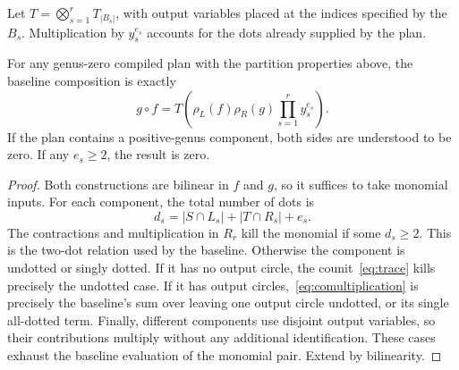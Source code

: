 Let $T=\bigotimes_{s=1}^{r}T_{|B_s|}$, with output variables placed at the
indices specified by the $B_s$. Multiplication by $y_s^{e_s}$ accounts for
the dots already supplied by the plan.

\begin{theorem}
\label{thm:factorization}
For any genus-zero compiled plan with the partition properties above,
the baseline composition is exactly
\begin{equation}
 g\circ f
 =T\left(\rho_L(f)\rho_R(g)\prod_{s=1}^{r}y_s^{e_s}\right).
 \label{eq:factorization}
\end{equation}
If the plan contains a positive-genus component, both sides are understood
to be zero. If any $e_s\geq2$, the result is zero.
\end{theorem}
\begin{proof}
Both constructions are bilinear in $f$ and $g$, so it suffices to take
monomial inputs. For each component, the total number of dots is
\[
 d_s=|S\cap L_s|+|T\cap R_s|+e_s.
\]
The contractions and multiplication in $R_r$ kill the monomial if some
$d_s\geq2$. This is the two-dot relation used by the baseline. Otherwise
the component is undotted or singly dotted. If it has no output circle,
the counit~\eqref{eq:trace} kills precisely the undotted case. If it has
output circles,~\eqref{eq:comultiplication} is precisely the baseline's
sum over leaving one output circle undotted, or its single all-dotted
term. Finally, different components use disjoint output variables, so their
contributions multiply without any additional identification. These cases
exhaust the baseline evaluation of the monomial pair. Extend by
bilinearity.
\end{proof}

\begin{center}
\end{center}

